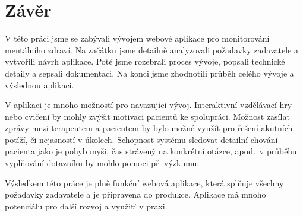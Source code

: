 \chapter*{Závěr}\label{ch:zaver}

V této práci jsme se zabývali vývojem webové aplikace pro monitorování mentálního zdraví.
Na začátku jsme detailně analyzovali požadavky zadavatele a vytvořili návrh aplikace.
Poté jsme rozebrali proces vývoje, popsali technické detaily a sepsali dokumentaci.
Na konci jsme zhodnotili průběh celého vývoje a výslednou aplikaci.

V aplikaci je mnoho možností pro navazující vývoj.
Interaktivní vzdělávací hry nebo cvičení by mohly zvýšit motivaci pacientů ke spolupráci.
Možnost zasílat zprávy mezi terapeutem a pacientem by bylo možné využít pro řešení akutních potíží, či nejasností v úkolech.
Schopnost systému sledovat detailní chování pacienta jako je pohyb myši, čas strávený na konkrétní otázce, apod.\ v průběhu vyplňování dotazníku by mohlo pomoci při výzkumu.

Výsledkem této práce je plně funkční webová aplikace, která splňuje všechny požadavky zadavatele a je připravena do produkce.
Aplikace má mnoho potenciálu pro další rozvoj a využití v praxi.